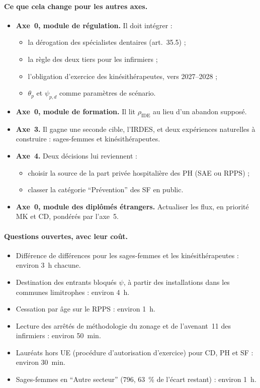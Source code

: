 \paragraph{Ce que cela change pour les autres axes.}
\begin{itemize}
\item \textbf{Axe~0, module de régulation.} Il doit intégrer :
  \begin{itemize}
  \item la dérogation des spécialistes dentaires (art.~35.5) ;
  \item la règle des deux tiers pour les infirmiers ;
  \item l'obligation d'exercice des kinésithérapeutes, vers 2027--2028 ;
  \item $\theta_p$ et $\psi_{p,d}$ comme paramètres de scénario.
  \end{itemize}
\item \textbf{Axe~0, module de formation.} Il lit $\rho_{\mathrm{IDE}}$ au
  lieu d'un abandon supposé.
\item \textbf{Axe~3.} Il gagne une seconde cible, l'IRDES, et deux
  expériences naturelles à construire : sages-femmes et kinésithérapeutes.
\item \textbf{Axe~4.} Deux décisions lui reviennent :
  \begin{itemize}
  \item choisir la source de la part privée hospitalière des PH (SAE ou
    RPPS) ;
  \item classer la catégorie \enquote{Prévention} des SF en public.
  \end{itemize}
\item \textbf{Axe~0, module des diplômés étrangers.} Actualiser les flux,
  en priorité MK et CD, pondérés par l'axe~5.
\end{itemize}

\paragraph{Questions ouvertes, avec leur coût.}
\begin{itemize}
\item Différence de différences pour les sages-femmes et les
  kinésithérapeutes : environ 3~h chacune.
\item Destination des entrants bloqués $\psi$, à partir des installations
  dans les communes limitrophes : environ 4~h.
\item Cessation par âge sur le RPPS : environ 1~h.
\item Lecture des arrêtés de méthodologie du zonage et de l'avenant~11 des
  infirmiers : environ 50~min.
\item Lauréats hors UE (procédure d'autorisation d'exercice) pour CD, PH
  et SF : environ 30~min.
\item Sages-femmes en \enquote{Autre secteur} (796, 63~\% de l'écart
  restant) : environ 1~h.
\end{itemize}



